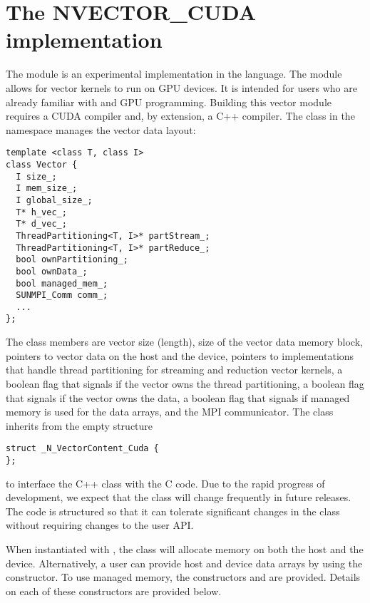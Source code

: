 %
\section{The NVECTOR\_CUDA implementation}\label{ss:nvec_cuda}

The {\nveccuda} module is an experimental {\nvector} implementation in the {\cuda} language.
The module allows for {\sundials} vector kernels to run on GPU devices. It is intended for users
who are already familiar with {\cuda} and GPU programming. Building this vector
module requires a CUDA compiler and, by extension, a C++ compiler. The class 
in the namespace  manages the vector data layout:

\begin{verbatim}
template <class T, class I>
class Vector {
  I size_;
  I mem_size_;
  I global_size_;
  T* h_vec_;
  T* d_vec_;
  ThreadPartitioning<T, I>* partStream_;
  ThreadPartitioning<T, I>* partReduce_;
  bool ownPartitioning_;
  bool ownData_;
  bool managed_mem_;
  SUNMPI_Comm comm_;
  ...
};
\end{verbatim}

The class members are vector size (length), size of the vector data memory
block, pointers to vector data on the host and the device, pointers
to  implementations that handle thread partitioning for
streaming and reduction vector kernels, a boolean flag that signals if the
vector owns the thread partitioning, a boolean flag that signals if the vector
owns the data, a boolean flag that signals if managed memory is used for the
data arrays, and the MPI communicator. The class  inherits from the
empty structure
\begin{verbatim}
struct _N_VectorContent_Cuda {
};
\end{verbatim}
to interface the C++ class with the {\nvector} C code. Due to the rapid progress
of {\cuda} development, we expect that the  class will
change frequently in future {\sundials} releases. The code is structured so that
it can tolerate significant changes in the  class without
requiring changes to the user API.

When instantiated with , the class  will allocate
memory on both the host and the device. Alternatively, a user can provide host
and device data arrays by using the  constructor. To use {\cuda}
managed memory, the constructors  and \newline
{} are provided. Details on each of these constructors
are provided below.

